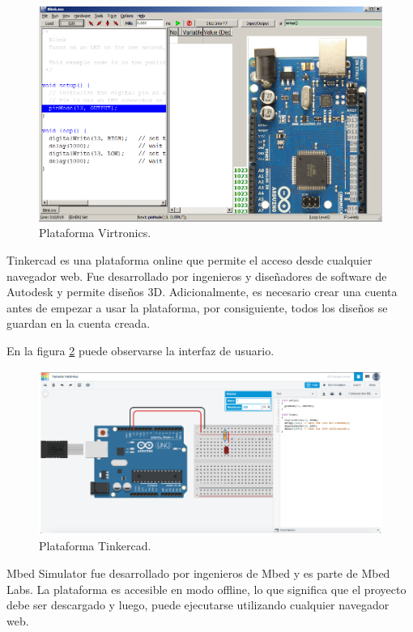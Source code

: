 \begin{figure}[ht]
	\centering
	\includegraphics[scale=.35]{./Figures/Virtronics.png}
	\caption{Plataforma Virtronics.}
	\label{fig:Virtronics}
\end{figure}


Tinkercad \citep{Tinkercad} es una plataforma online que permite el acceso desde cualquier navegador web. Fue desarrollado por ingenieros y diseñadores de software de Autodesk \citep{Autodesk} y permite diseños 3D. Adicionalmente, es necesario crear una cuenta  antes de empezar a usar la plataforma, por consiguiente, todos los diseños se guardan en la cuenta creada.

En la figura \ref{fig:Tinkercad} puede observarse la interfaz de usuario.

\begin{figure}[ht]
	\centering
	\includegraphics[scale=.42]{./Figures/Tinkercad.png}
	\caption{Plataforma Tinkercad.}
	\label{fig:Tinkercad}
\end{figure}


Mbed Simulator \citep{ArmMbedSim} fue desarrollado por ingenieros de Mbed \citep{ArmMbed} y es parte de Mbed Labs. La plataforma es accesible en modo offline, lo que significa que el proyecto debe ser descargado y luego, puede ejecutarse utilizando cualquier navegador web.

